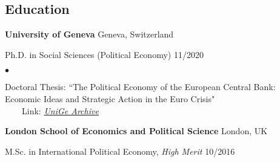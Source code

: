 \documentclass[margin, line]{res}
\newenvironment{list1}{
 \begin{list}{\ding{113}}{%
  \setlength{\itemsep}{0in}
  \setlength{\parsep}{0in} \setlength{\parskip}{0in}
  \setlength{\topsep}{0in} \setlength{\partopsep}{0in} 
  \setlength{\leftmargin}{0.17in}}}{\end{list}}
\newenvironment{list2}{
 \begin{list}{$\bullet$}{%
  \setlength{\itemsep}{0in}
  \setlength{\parsep}{0in} \setlength{\parskip}{0in}
  \setlength{\topsep}{0in} \setlength{\partopsep}{0in} 
  \setlength{\leftmargin}{0.2in}}}{\end{list}}
\begin{document}
\begin{resume}
\section{\sc Education}

\textbf{University of Geneva} \hfill Geneva, Switzerland \\
\vspace*{-.12in}
\begin{list1}
\item [] Ph.D. in Social Sciences (Political Economy) \hfill 11/2020\\[-2.5ex]
\begin{list2}
\vspace*{.04in}
\item[] Doctoral Thesis: ``The Political Economy of the European Central Bank: \\Economic Ideas and Strategic Action in the Euro Crisis" \\  \-\ \-\ \-\ \-\ Link: \href{https://archive-ouverte.unige.ch/unige:147497}{\textit{UniGe Archive}}
\end{list2}
\end{list1}

\textbf{London School of Economics and Political Science} \hfill London, UK \\
\vspace*{-.12in}
\begin{list1}
\item[] M.Sc. in International Political Economy, \textit{High Merit} \hfill 10/2016 \\[-2.5ex]
\end{list1}


\end{resume}
\end{document}

